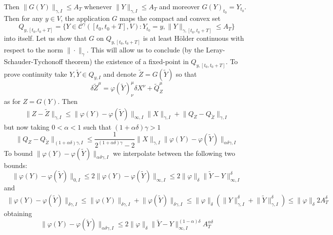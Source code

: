 \documentclass[a4paper,12pt,reqno]{amsproc}
\newcommand{\der}{\delta\!}
\newcommand{\CC}{\mathcal{C}}
\newcommand{\norm}[1]{\lVert #1\rVert}
\newcommand{\wt}{\widetilde}
\begin{document}
Then $\norm{G(Y)}_{\gamma,I} \le A_T$ whenever
$\norm{Y}_{\gamma,I} \le A_T$ and moreover $G(Y)_{t_0} = Y_{t_0}$. 
Then for any $y \in V$, the application $G$ maps the compact and convex
set 
\begin{equation}
  \label{eq:setQ}
Q_{y,[t_0,t_0+T]} = \{ Y \in \CC^\gamma([t_0,t_0+T],V) : Y_{t_0} = y, \norm{Y}_{\gamma,[t_0,t_0+T]}
\le A_T \}   
\end{equation}
into itself. Let us show that $G$ on $Q_{y,[t_0,t_0+T]}$ is at least
H\"older continuous with respect to the norm $\|\cdot\|_\gamma$. This
will allow us to conclude (by the Leray-Schauder-Tychonoff theorem)  the existence of a fixed-point in
$Q_{y,[t_0,t_0+T]}$.
To prove continuity take $Y,\wt Y \in Q_{y,I}$ and denote $\wt Z =
G(\wt Y)$ so that
$$
\der \wt Z^\mu = \varphi(\wt Y)^{\mu}_{\nu} \der X^\nu + \wt Q^\mu_Z
$$
as for $Z = G(Y)$.
Then
\begin{equation}
\label{eq:continuitybound0}
  \begin{split}
\norm{Z-\wt Z}_{\gamma,I} \le \norm{\varphi(Y)-\varphi(\wt
  Y)}_{\infty,I}
\norm{X}_{\gamma,I} + \norm{Q_Z-Q_{\wt Z}}_{\gamma,I}    
  \end{split}
\end{equation}
but now taking $0 < \alpha < 1$ such that $(1+\alpha\delta)\gamma > 1$
\begin{equation*}
\norm{Q_Z-Q_{\wt Z}}_{(1+\alpha\delta)\gamma,I} \le 
\frac{1}{2^{(1+\alpha\delta)\gamma}-2} \norm{X}_{\gamma,I}
\norm{\varphi(Y)-\varphi(\wt Y)}_{\alpha \delta \gamma,I}  
\end{equation*}
To bound $\norm{\varphi(Y)-\varphi(\wt Y)}_{\alpha \delta \gamma,I}$
we interpolate between the following two bounds:
\begin{equation*}
\norm{\varphi(Y)-\varphi(\wt Y)}_{0,I} \le 2
\norm{\varphi(Y)-\varphi(\wt Y)}_{\infty,I} \le 2
\norm{\varphi}_{\delta} \norm{\wt Y - Y}_{\infty,I}^\delta  
\end{equation*}
and
\begin{equation*}
  \begin{split}
\norm{\varphi(Y)-\varphi(\wt Y)}_{\delta \gamma,I} \le
\norm{\varphi(Y)}_{\delta\gamma,I} + \norm{\varphi(\wt
  Y)}_{\delta\gamma,I}
\le \norm{\varphi}_{\delta} (\norm{Y}_{\gamma,I}^\delta+\norm{\wt
  Y}_{\gamma,I}^\delta) \le \norm{\varphi}_\delta 2 A_T^\delta    
  \end{split}
\end{equation*}
obtaining
\begin{equation*}
  \norm{\varphi(Y)-\varphi(\wt Y)}_{\alpha \delta \gamma,I} \le 2
  \norm{\varphi}_\delta \norm{\wt Y - Y}_{\infty,I}^{(1-\alpha)\delta}
  A_T^{\alpha \delta} 
\end{equation*}
\end{document}
